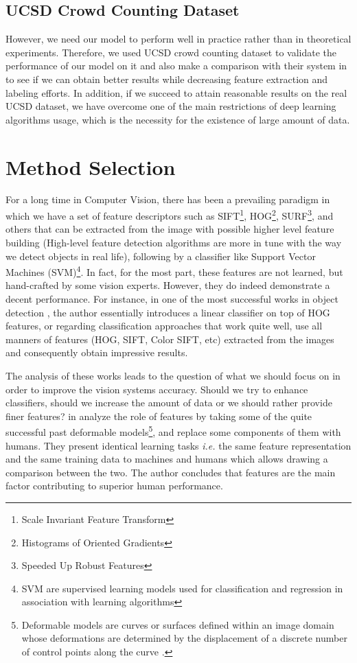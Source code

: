 \subsection{UCSD Crowd Counting Dataset}

However, we need our model to perform well in practice rather than in theoretical experiments. Therefore, we used UCSD crowd counting dataset \cite{chan2008privacy} to validate the performance of our model on it and also make a comparison with their system in \cite{chan2008privacy} to see if we can obtain better results while decreasing feature extraction and labeling efforts. In addition, if we succeed to attain reasonable results on the real UCSD dataset, we have overcome one of the main restrictions of deep learning algorithms usage, which is the necessity for the existence of large amount of data.     


\section{Method Selection}

For a long time in Computer Vision, there has been a prevailing paradigm in which we have a set of feature descriptors such as SIFT\footnote{Scale Invariant Feature Transform}, HOG\footnote{Histograms of Oriented Gradients}, SURF\footnote{Speeded Up Robust Features}, and others that can be extracted from the image with possible higher level feature building (High-level feature detection algorithms are more in tune with the way we detect objects in real life), following by a classifier like Support Vector Machines (SVM)\footnote{SVM are supervised learning models used for classification and regression in association with learning algorithms}. In fact, for the most part, these features are not learned, but hand-crafted by some vision experts. However, they do indeed demonstrate a decent performance. For instance, in one of the most successful works in object detection \cite{felzenszwalb2010object}, the author essentially introduces a linear classifier on top of HOG features, or regarding classification approaches that work quite well, \citeauthor{yu2010object} use all manners of features (HOG, SIFT, Color SIFT, etc) extracted from the images and consequently obtain impressive results. 

\indent The analysis of these works leads to the question of what we should focus on in order to improve the vision systems accuracy. Should we try to enhance classifiers, should we increase the amount of data or we should rather provide finer features? \citeauthor*{parikh2010role} in \cite{parikh2010role} analyze the role of features by taking some of the quite successful past deformable models\footnote{Deformable models are curves or surfaces defined within an image domain whose deformations are determined by the displacement of a discrete number of control points along the curve \cite{xu2000image}.}, and replace some components of them with humans. They present identical learning tasks \textit{i.e.} the same feature representation and the same training data to machines and humans which allows drawing a comparison between the two. The author concludes that features are the main factor contributing to superior human performance.

